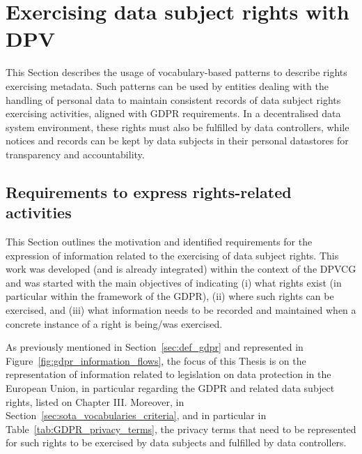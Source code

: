 \section{Exercising data subject rights with DPV}
\label{sec:rights_exercising}

This Section describes the usage of vocabulary-based patterns to describe rights exercising metadata.
Such patterns can be used by entities dealing with the handling of personal data to maintain consistent records of data subject rights exercising activities, aligned with GDPR requirements.
In a decentralised data system environment, these rights must also be fulfilled by data controllers,  while notices and records can be kept by data subjects in their personal datastores for transparency and accountability.

\subsection{Requirements to express rights-related activities}
\label{sec:rights_concepts}

This Section outlines the motivation and identified requirements for the expression of information related to the exercising of data subject rights.
This work was developed (and is already integrated) within the context of the DPVCG and was started with the main objectives of indicating (i) what rights exist (in particular within the framework of the GDPR), (ii) where such rights can be exercised, and (iii) what information needs to be recorded and maintained when a concrete instance of a right is being/was exercised.

As previously mentioned in Section~\ref{sec:def_gdpr} and represented in Figure~\ref{fig:gdpr_information_flows}, the focus of this Thesis is on the representation of information related to legislation on data protection in the European Union, in particular regarding the GDPR and related data subject rights, listed on Chapter III.
Moreover, in Section~\ref{sec:sota_vocabularies_criteria}, and in particular in Table~\ref{tab:GDPR_privacy_terms}, the privacy terms that need to be represented for such rights to be exercised by data subjects and fulfilled by data controllers.

